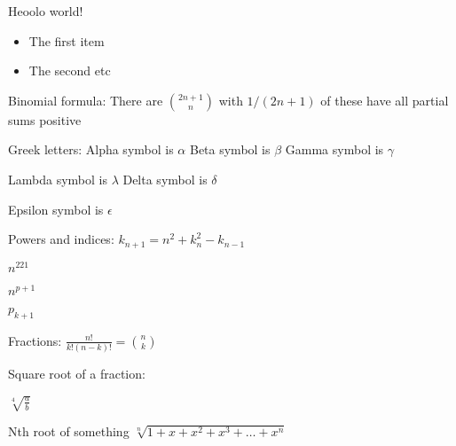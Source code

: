 \documentclass{article}
\begin{document}
Heoolo world!

\begin{itemize}
\item The first item
\item The second etc 
\end{itemize}

Binomial formula:
There are $\binom{2n+1}{n}$ with $1/(2n+1)$ of
these have all partial sums positive

Greek letters:
Alpha symbol is $\alpha$
Beta symbol is $\beta$
Gamma symbol is $\gamma$




Lambda symbol is $\lambda$
Delta symbol is $\delta$


Epsilon symbol is $\epsilon$


Powers and indices:
$k_{n+1} = n^2 + k_n^2 - k_{n-1}$

$n^{221}$

$n^{p+1}$

$p_{k+1}$

Fractions: 
$\frac{n!}{k!(n-k)!} = \binom{n}{k}$




Square root of a fraction:

$\sqrt[4]{\frac{a}{b}}$

Nth root of something
$\sqrt[n]{1+x+x^2+x^3+\dots+x^n}$
\end{document}
